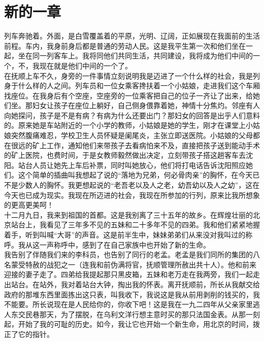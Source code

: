 \fancyhead[RO]{\thepage} %
\fancyhead[LE]{\thepage} %
\chapter*{新的一章}
列车奔驰着。外面，是白雪覆盖着的平原，光明、辽阔，正如展现在我面前的生活前程。车内，我身前身后都是普通的劳动人民。这是我平生第一次和他们坐在一起，坐在同一列客车上。我将同他们共同生活，共同建设，我将成为他们中间的一个，不，我现在就是他们中间的一个了。\\

在抚顺上车不久，身旁的一件事情立刻说明我是迈进了一个什么样的社会，我是列身于什么样的人之间。列车员和一位女乘客搀扶着一个小姑娘，走进我们这个车厢找座位。在我身后有个空座，空座旁的一位乘客把自己的位子一齐让了出来，给她们坐。那妇女让孩子在座位上躺好，自己侧身偎靠着她，神情十分焦灼。邻座有人向她探问，孩子是不是有病？有病为什么还要出门？那妇女的回答是出乎人们意料的。原来她是车站附近的一个小学的教师，小姑娘是她的学生，刚才在课堂上小姑娘突然腹痛难忍，学校卫生人员怀疑是阑尾炎，主张立即送医院。小姑娘的父母都在很远的矿上工作，通知他们来带孩子去看病怕来不及，直接把孩子送到能动手术的矿上医院，也费时间，于是女教师毅然做出决定，立刻带孩子搭这趟客车去沈阳。站台人员让她先上车后补票，同时叫她放心，他们将打电话告诉沈阳照应她们。这个简单的插曲叫我想起了说的“落地为兄弟，何必骨肉亲”的胸怀，在今天已不是少数人的胸怀。我更想起说的“老吾老以及人之老，幼吾幼以及人之幼”，这在今天也已成为现实。我现在所迈进的社会，我现在所参加的行列，原来比我所想象的更高更美呵！\\

十二月九日，我来到祖国的首都。这是我别离了三十五年的故乡。在辉煌壮丽的北京站台上，我看见了三年多不见的五妹和二十多年不见的四弟。我和他们紧紧地握着手，听到叫喊“大哥”的声音。这是前半生中，妹妹弟弟们从来没对我叫过的称呼。我从这一声称呼中，感到了在自己家族中也开始了新的生命。\\

我告别了伴随我们来的李科员，也告别了同行的老孟。老孟是我们同所的集团的八名蒙受特赦的战犯之一（连我和前伪满将官，抚顺管理所赦出共十人）。他和前来迎接的妻子走了。四弟给我提起那只黑皮箱，五妹和老万走在我两旁，我们一起走出站台。在站外，我对着站台大钟，掏出我的怀表。离开抚顺前，所长从我献交给政府的那堆东西里面拣出这只表，叫我收下，我说这是我从前用剥削的钱买的，我不能要。所长说现在是人民给你的，你收下吧！这是我在一九二四年从父亲家里逃人东交民巷那天，为了摆脱，在乌利文洋行想主意时买的那只法国金表。从那一刻起，开始了我的可耻的历史。如今，我让它也开始一个新生命，用北京的时间，拨正了它的指针。\\

